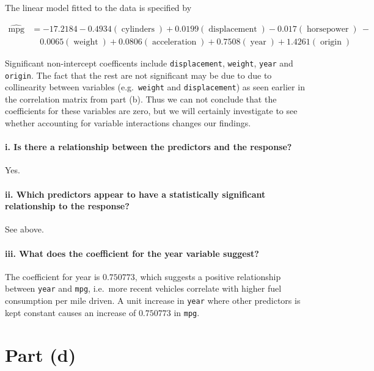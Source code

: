 \documentclass[
  11pt,
  a4paper]{article}
\begin{document}
The linear model fitted to the data is specified by

\begin{equation}
\begin{aligned}
\operatorname{\widehat{mpg}} &= -17.2184 - 0.4934(\operatorname{cylinders}) + 0.0199(\operatorname{displacement}) - 0.017(\operatorname{horsepower})\ - \\
&\quad 0.0065(\operatorname{weight}) + 0.0806(\operatorname{acceleration}) + 0.7508(\operatorname{year}) + 1.4261(\operatorname{origin})
\end{aligned}
\end{equation}

Significant non-intercept coefficents include \texttt{displacement}, \texttt{weight}, \texttt{year} and \texttt{origin}.
The fact that the rest are not significant may be due to due to collinearity between variables (e.g.~\texttt{weight} and \texttt{displacement}) as seen earlier in the correlation matrix from part (b). Thus we can not conclude that the coefficients for these variables are zero, but we will certainly investigate to see whether accounting for variable interactions changes our findings.

\paragraph{i. Is there a relationship between the predictors and the response?}\label{i.-is-there-a-relationship-between-the-predictors-and-the-response}

Yes.

\paragraph{ii. Which predictors appear to have a statistically significant relationship to the response?}\label{ii.-which-predictors-appear-to-have-a-statistically-significant-relationship-to-the-response}

See above.

\paragraph{iii. What does the coefficient for the year variable suggest?}\label{iii.-what-does-the-coefficient-for-the-year-variable-suggest}

The coefficient for year is \(0.750773\), which suggests a positive relationship between \texttt{year} and \texttt{mpg}, i.e.~more recent vehicles correlate with higher fuel consumption per mile driven. A unit increase in \texttt{year} where other predictors is kept constant causes an increase of \(0.750773\) in \texttt{mpg}.

\section{Part (d)}\label{part-d}
\end{document}
